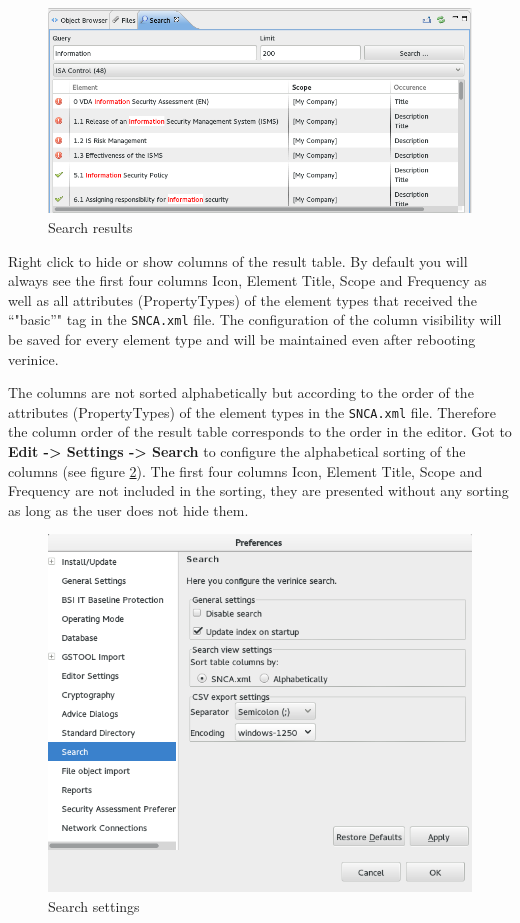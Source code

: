 \documentclass[a4paper,10pt]{book}
\begin{document}
\begin{figure}[ht]
  \centering
  \includegraphics[width=.9\textwidth]{Screenshot/search-view.png}
  \caption{Search results}
  \label{fig:search-view}
\end{figure}

Right click to hide or show columns of the result table. By default
you will always see the first four columns Icon, Element Title, Scope
and Frequency as well as all attributes (PropertyTypes) of the element
types that received the ``"basic''" tag in the \texttt{SNCA.xml}
file. The configuration of the column visibility will be saved for
every element type and will be maintained even after rebooting
verinice.

The columns are not sorted alphabetically but according to the order
of the attributes (PropertyTypes) of the element types in the
\texttt{SNCA.xml} file. Therefore the column order of the result table
corresponds to the order in the editor. Got to \textbf{Edit ->
  Settings -> Search} to configure the alphabetical sorting of the
columns (see figure \ref{fig:search-settings}). The first four columns
Icon, Element Title, Scope and Frequency are not included in the
sorting, they are presented without any sorting as long as the user
does not hide them.


\begin{figure}[h]
  \centering
  \includegraphics[width=.9\textwidth]{Screenshot/search-settings.png}
  \caption{Search settings}
  \label{fig:search-settings}
\end{figure}
\end{document}
